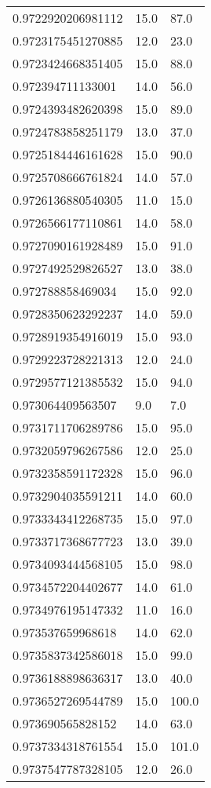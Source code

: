 \begin{center}
\begin{supertabular}[H]{p{0.30\textwidth}p{0.05\textwidth}p{0.05\textwidth}}
0.9722920206981112 & 15.0 & 87.0 \\ 
0.9723175451270885 & 12.0 & 23.0 \\ 
0.9723424668351405 & 15.0 & 88.0 \\ 
0.972394711133001 & 14.0 & 56.0 \\ 
0.9724393482620398 & 15.0 & 89.0 \\ 
0.9724783858251179 & 13.0 & 37.0 \\ 
0.9725184446161628 & 15.0 & 90.0 \\ 
0.9725708666761824 & 14.0 & 57.0 \\ 
0.9726136880540305 & 11.0 & 15.0 \\ 
0.9726566177110861 & 14.0 & 58.0 \\ 
0.9727090161928489 & 15.0 & 91.0 \\ 
0.9727492529826527 & 13.0 & 38.0 \\ 
0.972788858469034 & 15.0 & 92.0 \\ 
0.9728350623292237 & 14.0 & 59.0 \\ 
0.9728919354916019 & 15.0 & 93.0 \\ 
0.9729223728221313 & 12.0 & 24.0 \\ 
0.9729577121385532 & 15.0 & 94.0 \\ 
0.973064409563507 & 9.0 & 7.0 \\ 
0.9731711706289786 & 15.0 & 95.0 \\ 
0.9732059796267586 & 12.0 & 25.0 \\ 
0.9732358591172328 & 15.0 & 96.0 \\ 
0.9732904035591211 & 14.0 & 60.0 \\ 
0.9733343412268735 & 15.0 & 97.0 \\ 
0.9733717368677723 & 13.0 & 39.0 \\ 
0.9734093444568105 & 15.0 & 98.0 \\ 
0.9734572204402677 & 14.0 & 61.0 \\ 
0.9734976195147332 & 11.0 & 16.0 \\ 
0.973537659968618 & 14.0 & 62.0 \\ 
0.9735837342586018 & 15.0 & 99.0 \\ 
0.9736188898636317 & 13.0 & 40.0 \\ 
0.9736527269544789 & 15.0 & 100.0 \\ 
0.973690565828152 & 14.0 & 63.0 \\ 
0.9737334318761554 & 15.0 & 101.0 \\ 
0.9737547787328105 & 12.0 & 26.0 \\ 

\end{supertabular}
\end{center}
